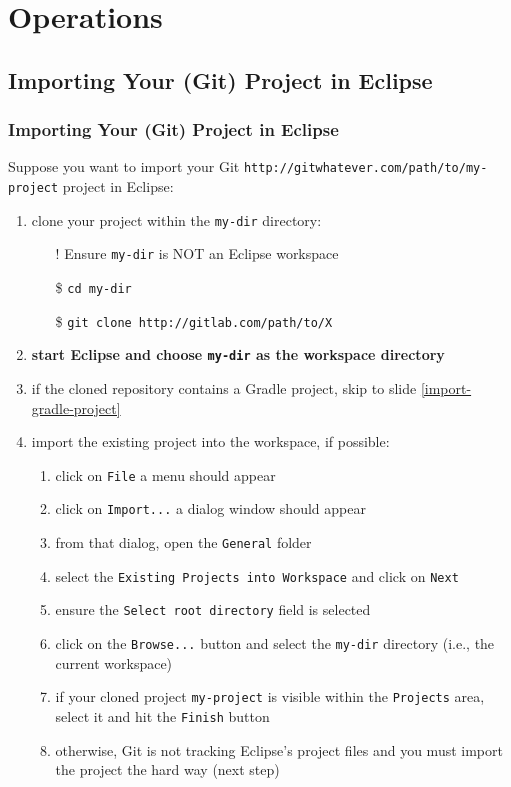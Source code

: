 \documentclass[presentation]{beamer}\mode<presentation>{\usetheme{AMSBolognaFC}}
\begin{document}
\section{Operations}

\subsection{Importing Your (Git) Project in Eclipse}

\begin{frame}[c,allowframebreaks]
\frametitle{Importing Your (Git) Project in Eclipse}
    Suppose you want to import your Git \texttt{http://gitwhatever.com/path/to/\alert{my-project}} project in Eclipse:
    \begin{enumerate}
        \item clone your project within the \texttt{\alert{my-dir}} directory:
        \begin{itemize}
            \item[!] Ensure \texttt{my-dir} is NOT an Eclipse workspace
            \item[\$] \texttt{cd \alert{my-dir}}
            \item[\$] \texttt{git clone http://gitlab.com/path/to/X}
        \end{itemize}

        \item \textbf{start Eclipse and choose \texttt{\alert{my-dir}} as the workspace directory}

        \item if the cloned repository contains a Gradle project, skip to slide \ref{import-gradle-project}

        \item import the existing project into the workspace, if possible:
        \begin{enumerate}
            \item click on \texttt{File} a menu should appear
            \item click on \texttt{Import...} a dialog window should appear
            \item from that dialog, open the \texttt{General} folder
            \item select the \texttt{Existing Projects into Workspace} and click on \texttt{Next}
            \item ensure the \texttt{Select root directory} field is selected
            \item click on the \texttt{Browse...} button and select the \texttt{\alert{my-dir}} directory (i.e.,  the current workspace)
            \item if your cloned project \texttt{\alert{my-project}} is visible within the \texttt{Projects} area, select it and hit the \texttt{Finish} button
            \item otherwise, Git is not tracking Eclipse's project files and you must import the project the hard way (next step)
        \end{enumerate}


\end{enumerate}
\end{frame}
\end{document}
